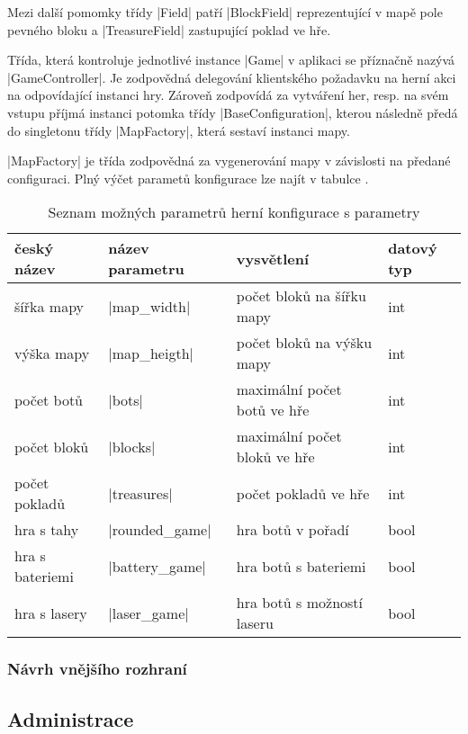 Mezi další pomomky třídy \ic|Field| patří \ic|BlockField| reprezentující v mapě pole pevného bloku a \ic|TreasureField| zastupující poklad ve hře.

Třída, která kontroluje jednotlivé instance \ic|Game| v aplikaci se příznačně nazývá \ic|GameController|. Je zodpovědná delegování klientského požadavku na herní akci na odpovídající instanci hry. Zároveň zodpovídá za vytváření her, resp. na svém vstupu příjmá instanci potomka třídy \ic|BaseConfiguration|, kterou následně předá do singletonu třídy \ic|MapFactory|, která sestaví instanci mapy.

\ic|MapFactory| je třída zodpovědná za vygenerování mapy v závislosti na předané configuraci. Plný výčet parametů konfigurace lze najít v tabulce .

\begin{table}[H]
	\begin{tabular}{llll}
		český název & název parametru & vysvětlení & datový typ \\
		\hline
		šířka mapy & \ic|map_width| & počet bloků na šířku mapy & int \\
		výška mapy & \ic|map_heigth| & počet bloků na výšku mapy & int \\
		počet botů & \ic|bots| & maximální počet botů ve hře & int \\
		počet bloků & \ic|blocks| & maximální počet bloků ve hře & int \\
		počet pokladů & \ic|treasures| & počet pokladů ve hře & int \\
		hra s tahy & \ic|rounded_game| & hra botů v pořadí & bool \\
		hra s bateriemi & \ic|battery_game| & hra botů s bateriemi & bool \\
		hra s lasery & \ic|laser_game| & hra botů s možností laseru & bool \\
	\end{tabular}
	\caption{Seznam možných parametrů herní konfigurace s parametry}
	\label{table:conf-parameters}
\end{table}

\subsubsection{Návrh vnějšího rozhraní}
\subsection{Administrace}

